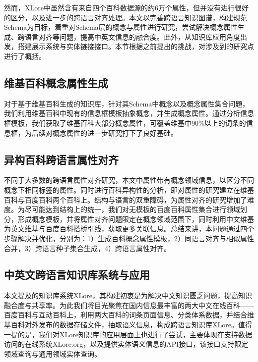 然而，XLore中虽然含有来自四个百科数据源的约6万个属性，但并没有进行很好的区分，以及进一步的跨语言对齐处理。本文以完善跨语言知识图谱，构建规范Schema为目标，着重对Schema层的概念与属性进行研究，尝试解决概念属性生成、跨语言对齐等问题，提高中英文信息的融合度。此外，从知识库应用角度出发，搭建展示系统与实体链接接口。本节根据之前提出的挑战，对涉及到的研究点进行了概括。

\subsection{维基百科概念属性生成}
对于基于维基百科生成的知识库，针对其Schema中概念以及概念属性集合问题，我们利用维基百科中现有的信息框模板抽象概念，并生成概念属性。通过分析信息框模板，我们获取了维基百科大部分概念属性，可覆盖维基中90\%以上的词条的信息框，为后续对概念属性的进一步研究打下了良好基础。

\subsection{异构百科跨语言属性对齐}
不同于大多数的跨语言属性对齐研究，本文中属性带有概念领域信息，以区分不同概念下相同标签的属性。同时进行百科异构性的分析，即对属性的研究建立在维基百科与百度百科两个百科上。结构与语言的双重障碍，为属性对齐的研究增加了难度。为尽可能达到结构上的统一，我们对无模板的百度百科属性集合进行领域划分，形成概念模板，并将属性对齐问题限定在概念领域范围下，同时利用中文维基为英文维基与百度百科搭桥引线，获取更多关联信息。总结来讲，本问题通过四个步骤解决并优化，分别为：1）生成百科概念属性模板，2）同语言对齐与相似属性合并，3）跨语言种子集合生成，4）跨语言属性对齐。

\subsection{中英文跨语言知识库系统与应用}
本文提及的知识库系统XLore，其构建初衷是为解决中文知识匮乏问题，提高知识融合度与共享率。为此我们将目光聚焦在国内信息最丰富的两大中文在线百科——百度百科与互动百科上，利用两大百科的词条页面信息、分类体系数据，并结合维基百科对外发布的数据存储文件，抽取语义信息，构成跨语言知识库XLore。值得一提的是，我们对XLore知识库的应用层面上也进行了尝试，主要体现在支持数据访问的在线系统XLore.org，以及提供实体语义信息的API接口，该接口支持限定领域查询与通用领域实体查询。

